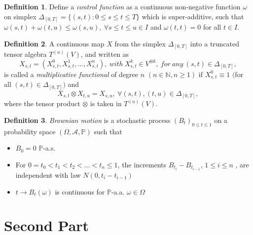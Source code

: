 \documentclass[12pt,a4paper]{report}
\theoremstyle{definition}
\newtheorem{definition}{Definition}
\begin{document}
\begin{appendix}
\begin{definition}\parencite{lyons2002system}
	Define a \textit{control function} as a continuous non-negative function $\omega$ on simplex $\Delta_{[0,T]}=\{(s,t): 0\leq s\leq t\leq T \}$ which is super-additive, such that $\omega(s, t) + \omega(t, u) \leq \omega(s, u), \: \forall s \leq t \leq u \in I$ and $\omega(t, t)=0$ for all $t \in I$.
\end{definition}


\begin{definition}\parencite{lyons2002system}
	A continuous map $X$ from the simplex $\Delta_{[0,T]}$ into a truncated tensor algebra $T^{(n)}(V)$, and written as	
	\begin{equation}
			X_{s,t}=(X_{s,t}^0, X_{s,t}^1,..., X_{s,t}^n), \: with \: X_{s,t}^k\in V^{\otimes k}, \: for\: any \:(s,t)\in \Delta_{[0,T]},
			\end{equation}
	is called a \textit{multiplicative functional} of degree $n$ $(n\in \mathbb{N},n\geq1)$ if $X_{s,t}^0\equiv 1$ $($for all $(s,t) \in \Delta_{[0,T]})$ and
	\begin{equation}
		X_{s,t}\otimes X_{t,u}=X_{s,u},\: \forall (s,t),(t,u) \in \Delta_{[0,T]}, 
	\end{equation}
where the tensor product $\otimes$ is taken in $T^{(n)}(V)$.
\end{definition}




\begin{definition}\parencite{karatzas1991brownian}
	\textit{Brownian motion} is a stochastic process $(B_t)_{0\leq t\leq1}$ on a probability space $(\Omega, \mathcal{A}, \mathbb{P})$ such that	
	\begin{itemize}
		\item $B_0 = 0$ $\mathbb{P}$-a.s.
		\item For $0 = t_0 < t_1 < t_2 < ...< t_n \leq 1$, the increments $B_{t_i} - B_{t_{i-1}}$, $1 \leq i \leq n$ , are independent with law $N(0, t_i - t_{i-1})$
		\item $t \rightarrow B_t(\omega)$ is continuous for $\mathbb{P}$-a.a. $\omega \in \Omega$
	\end{itemize} 
\end{definition}

	
	\section{Second Part}

	
\end{appendix}
\end{document}
